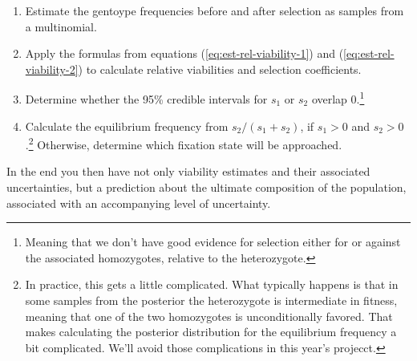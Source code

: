 \begin{enumerate}

\item Estimate the gentoype frequencies before and after selection as
  samples from a multinomial.

\item Apply the formulas from equations (\ref{eq:est-rel-viability-1})
  and (\ref{eq:est-rel-viability-2}) to calculate relative viabilities
  and selection coefficients.

\item Determine whether the 95\% credible intervals for $s_1$ or $s_2$
  overlap 0.\footnote{Meaning that we don't have good evidence for
  selection either for or against the associated homozygotes, relative
  to the heterozygote.}

\item Calculate the equilibrium frequency from $s_2/(s_1+s_2)$, if
  $s_1 > 0$ and $s_2 > 0$.\footnote{In practice, this gets a little
    complicated. What typically happens is that in some samples from
    the posterior the heterozygote is intermediate in fitness, meaning
    that one of the two homozygotes is unconditionally favored. That
    makes calculating the posterior distribution for the equilibrium
    frequency a bit complicated. We'll avoid those complications in
    this year's projecct.} Otherwise, determine which fixation state
  will be approached.

\end{enumerate}

\noindent In the end you then have not only viability estimates and
their associated uncertainties, but a prediction about the ultimate
composition of the population, associated with an accompanying level
of uncertainty.

